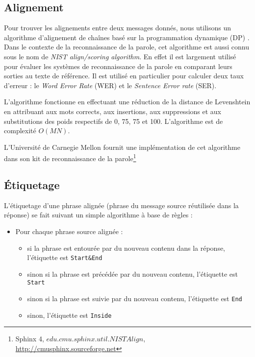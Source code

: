 \label{subsec:tokenization}

\subsection{Alignement}

\label{subsec:alignment}

Pour trouver les alignements entre deux messages donnés, nous utilisons un algorithme d'alignement de chaînes basé sur la programmation dynamique (DP) \cite{sankoff:1983}. Dans le contexte de la reconnaissance de la parole, cet algorithme est aussi connu sous le nom de \textit{NIST align/scoring algorithm}. En effet il est largement utilisé pour évaluer les systèmes de reconnaissance de la parole en comparant leurs sorties au texte de référence. Il est utilisé en particulier pour calculer deux taux d'erreur : le \textit{Word Error Rate} (WER) et le \textit{Sentence Error rate} (SER).

L'algorithme fonctionne en effectuant une réduction de la distance de Levenshtein en attribuant aux mots corrects, aux insertions, aux suppressions et aux substitutions des poids respectifs de 0, 75, 75 et 100. L'algorithme est de complexité $O(MN)$.

L'Université de Carnegie Mellon fournit une implémentation de cet algorithme dans son kit de reconnaissance de la parole\footnote{Sphinx 4, $edu.cmu.sphinx.util.NISTAlign$, \url{http://cmusphinx.sourceforge.net}}

\subsection{Étiquetage}

\label{subsec:labelling}

L'étiquetage d'une phrase alignée (phrase du message source réutilisée dans la réponse) se fait suivant un simple algorithme à base de règles :

\begin{itemize}
    \item[\bullet] Pour chaque phrase source alignée :
    \begin{itemize}
        \item[\bullet] si la phrase est entourée par du nouveau contenu dans la réponse, l'étiquette est \texttt{Start\&End}
        \item[\bullet] sinon si la phrase est précédée par du nouveau contenu, l'étiquette est \texttt{Start}
        \item[\bullet] sinon si la phrase est suivie par du nouveau contenu, l'étiquette est \texttt{End}
        \item[\bullet] sinon, l'étiquette est \texttt{Inside}
    \end{itemize}
\end{itemize}

